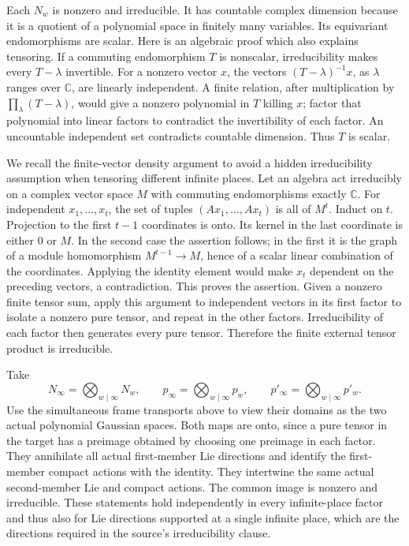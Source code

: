 Each \(N_w\) is nonzero and irreducible.
It has countable complex dimension because it is a quotient
of a polynomial space in finitely many variables.
Its equivariant endomorphisms are scalar.
Here is an algebraic proof which also explains tensoring.
If a commuting endomorphism \(T\) is nonscalar, irreducibility
makes every \(T-\lambda\) invertible. For a nonzero vector \(x\),
the vectors \((T-\lambda)^{-1}x\), as \(\lambda\) ranges over
\(\mathbb C\), are linearly independent.
A finite relation, after multiplication by
\(\prod_\lambda(T-\lambda)\), would give a nonzero polynomial
in \(T\) killing \(x\); factor that polynomial into linear
factors to contradict the invertibility of each factor.
An uncountable independent set contradicts countable dimension.
Thus \(T\) is scalar.

We recall the finite-vector density argument to avoid a hidden
irreducibility assumption when tensoring different infinite places.
Let an algebra act irreducibly on a complex vector space \(M\)
with commuting endomorphisms exactly \(\mathbb C\).
For independent \(x_1,\ldots,x_t\), the set of tuples
\((A x_1,\ldots,A x_t)\) is all of \(M^t\).
Induct on \(t\). Projection to the first \(t-1\) coordinates
is onto. Its kernel in the last coordinate is either \(0\)
or \(M\). In the second case the assertion follows; in the
first it is the graph of a module homomorphism
\(M^{t-1}\to M\), hence of a scalar linear combination
of the coordinates. Applying the identity element would
make \(x_t\) dependent on the preceding vectors, a contradiction.
This proves the assertion.
Given a nonzero finite tensor sum, apply this argument to
independent vectors in its first factor to isolate a nonzero
pure tensor, and repeat in the other factors.
Irreducibility of each factor then generates every pure tensor.
Therefore the finite external tensor product is irreducible.

Take
\[
       N_\infty=\bigotimes_{w\mid\infty}N_w,\qquad
       p_\infty=\bigotimes_{w\mid\infty}p_w,\qquad
       p'_\infty=\bigotimes_{w\mid\infty}p'_w .
\]
Use the simultaneous frame transports above to view their
domains as the two actual polynomial Gaussian spaces.
Both maps are onto, since a pure tensor in the target has
a preimage obtained by choosing one preimage in each factor.
They annihilate all actual first-member Lie directions
and identify the first-member compact actions with the identity.
They intertwine the same actual second-member Lie and compact
actions. The common image is nonzero and irreducible.
These statements hold independently in every infinite-place
factor and thus also for Lie directions supported at a
single infinite place, which are the directions required
in the source's irreducibility clause.

